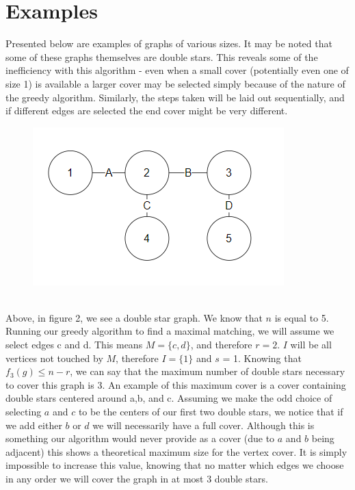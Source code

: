 \documentclass{article}
\begin{document}
		\section{Examples}
		Presented below are examples of graphs of various sizes. It may be noted that some of these graphs themselves are double stars. This reveals some of the inefficiency with this algorithm - even when a small cover (potentially even one of size 1) is available a larger cover may be selected simply because of the nature of the greedy algorithm. Similarly, the steps taken will be laid out sequentially, and if different edges are selected the end cover might be very different.
		 \\
				\begin{figure}[h]
				\caption{}
				\includegraphics{Figure2}
			\end{figure}
		\\
			Above, in figure 2, we see a double star graph. We know that $n$ is equal to 5. Running our greedy algorithm to find a maximal matching, we will assume we select edges c and d. This means $M = \{c,d\}$, and therefore $r = 2$. $I$ will be all vertices not touched by $M$, therefore $I = \{1\}$ and $s$ = 1. Knowing that $f_{3}(g) \leq n-r$, we can say that the maximum number of double stars necessary to cover this graph is 3. An example of this maximum cover is a cover containing double stars centered around a,b, and c. Assuming we make the odd choice of selecting $a$ and $c$ to be the centers of our first two double stars, we notice that if we add either $b$ or $d$ we will necessarily have a full cover. Although this is something our algorithm would never provide as a cover (due to $a$ and $b$ being adjacent) this shows a theoretical maximum size for the vertex cover. It is simply impossible to increase this value, knowing that no matter which edges we choose in any order we will cover the graph in at most 3 double stars.
	
\end{document}
